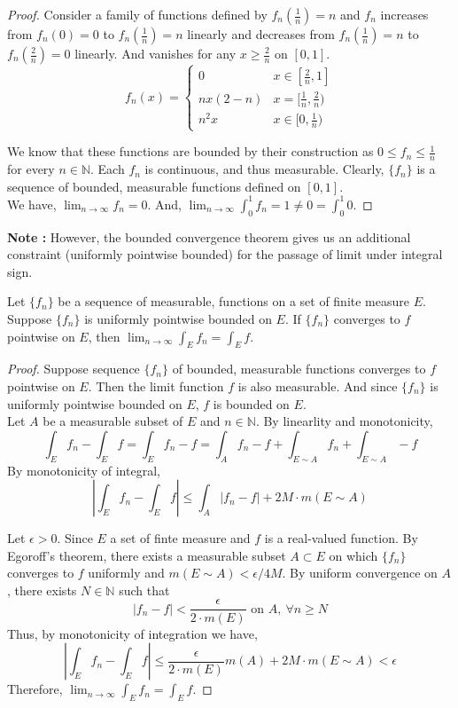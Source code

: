\begin{proof}
	Consider a family of functions defined by $f_n(\frac{1}{n}) = n$ and $f_n$ increases from $f_n(0) = 0$ to $f_n(\frac{1}{n}) = n$ linearly and decreases from $f_n(\frac{1}{n}) = n$ to $f_n(\frac{2}{n}) = 0$ linearly. And vanishes for any $x \ge \frac{2}{n}$ on $[0,1]$.
	$$ f_n(x) = \begin{cases} 0 & x \in [\frac{2}{n},1] \\ nx(2-n) & x = [\frac{1}{n},\frac{2}{n}) \\ n^2 x & x \in [0,\frac{1}{n}) \end{cases}$$

	We know that these functions are bounded by their construction as $0 \le f_n \le \frac{1}{n}$ for every $n \in \mathbb{N}$.
	Each $f_n$ is continuous, and thus measurable.
	Clearly, $\{ f_n \}$ is a sequence of bounded, measurable functions defined on $[0,1]$.\\

	We have, $\displaystyle \lim_{n \to \infty} f_n = 0$.
	And, $\displaystyle \lim_{n \to \infty}\int_0^1 f_n  = 1 \ne 0 = \int_0^1 0$.
\end{proof}
	\textbf{Note :} However, the bounded convergence theorem gives us an additional constraint (uniformly pointwise bounded) for the passage of limit under integral sign.
\begin{theorem}
	Let $\{ f_n \}$ be a sequence of measurable, functions on a set of finite measure $E$.
	Suppose $\{ f_n \}$ is uniformly pointwise bounded on $E$.
	If $\{ f_n \}$ converges to $f$ pointwise on $E$, then $\displaystyle \lim_{n \to \infty} \int_E f_n = \int_E f$.
\end{theorem}
\begin{proof}
	Suppose sequence $\{ f_n \}$ of bounded, measurable functions converges to $f$ pointwise on $E$.
	Then the limit function $f$ is also measurable.
	And since $\{ f_n \}$ is uniformly pointwise bounded on $E$, $f$ is bounded on $E$.\\

	Let $A$ be a measurable subset of $E$ and $n \in \mathbb{N}$.
	By linearlity and monotonicity,
	$$ \int_E f_n - \int_E f = \int_E f_n - f = \int_A f_n - f + \int_{E \sim A} f_n + \int_{E \sim A}-f$$
	By monotonicity of integral,
	\begin{equation}
	 	\left| \int_E f_n - \int_E f \right| \le \int_A |f_n - f| + 2M \cdot m(E \sim A)
	\end{equation}

	Let $\epsilon > 0$.
	Since $E$ a set of finte measure and $f$ is a real-valued function.
	By Egoroff's theorem, there exists a measurable subset $A \subset E$ on which $\{ f_n \}$ converges to $f$ uniformly and $m(E \sim A ) < \epsilon/4M$.
	By uniform convergence on $A$, there exists $N \in \mathbb{N}$ such that
	$$ |f_n - f| < \frac{\epsilon}{2 \cdot m(E)} \text{ on } A,\ \forall n \ge N$$
	Thus, by monotonicity of integration we have,
	$$ \left| \int_E f_n - \int_E f \right| \le \frac{\epsilon}{2 \cdot m(E)} m(A) + 2M \cdot m(E \sim A) < \epsilon $$
	Therefore, $\displaystyle \lim_{n \to \infty} \int_E f_n = \int_E f$.
\end{proof}

